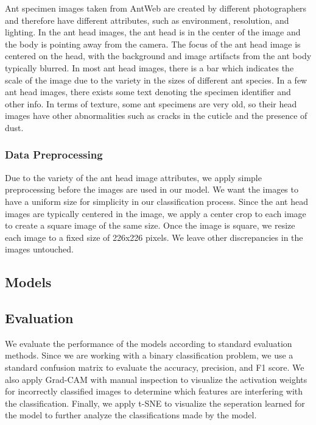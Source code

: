 \documentclass[12pt]{article}
\begin{document}
Ant specimen images taken from AntWeb \cite{perrichot_antweb_2012} are created
by different photographers and therefore have different attributes, such as
environment, resolution, and lighting. In the ant head images, the ant head is
in the center of the image and the body is pointing away from the camera. The
focus of the ant head image is centered on the head, with the background and
image artifacts from the ant body typically blurred. In most ant head images,
there is a bar which indicates the scale of the image due to the variety in the
sizes of different ant species. In a few ant head images, there exists some text
denoting the specimen identifier and other info. In terms of texture, some ant
specimens are very old, so their head images have other abnormalities such as
cracks in the cuticle and the presence of dust.

\subsubsection{Data Preprocessing}

Due to the variety of the ant head image attributes, we apply simple
preprocessing before the images are used in our model. We want the images to
have a uniform size for simplicity in our classification process. Since the ant
head images are typically centered in the image, we apply a center crop to each
image to create a square image of the same size. Once the image is square, we
resize each image to a fixed size of 226x226 pixels. We leave other
discrepancies in the images untouched.

\subsection{Models}

\subsection{Evaluation}

We evaluate the performance of the models according to standard evaluation
methods. Since we are working with a binary classification problem, we use a
standard confusion matrix to evaluate the accuracy, precision, and F1 score. We
also apply Grad-CAM with manual inspection to visualize the activation weights
for incorrectly classified images to determine which features are interfering
with the classification. Finally, we apply t-SNE to visualize the seperation
learned for the model to further analyze the classifications made by the model.
\end{document}
